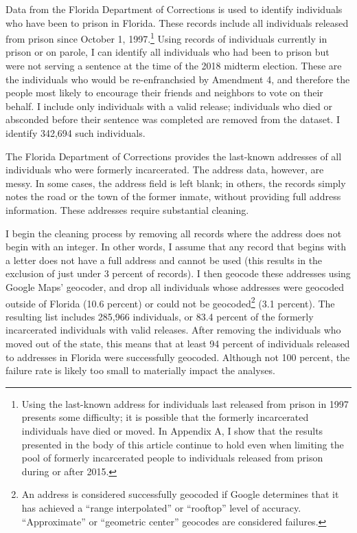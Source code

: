 \documentclass[
  12pt,
]{article}
\begin{document}
Data from the Florida Department of Corrections is used to identify individuals who have been to prison in Florida. These records include all individuals released from prison since October 1, 1997.\footnote{Using the last-known address for individuals last released from prison in 1997 presents some difficulty; it is possible that the formerly incarcerated individuals have died or moved. In Appendix A, I show that the results presented in the body of this article continue to hold even when limiting the pool of formerly incarcerated people to individuals released from prison during or after 2015.} Using records of individuals currently in prison or on parole, I can identify all individuals who had been to prison but were not serving a sentence at the time of the 2018 midterm election. These are the individuals who would be re-enfranchsied by Amendment 4, and therefore the people most likely to encourage their friends and neighbors to vote on their behalf. I include only individuals with a valid release; individuals who died or absconded before their sentence was completed are removed from the dataset. I identify 342,694 such individuals.

The Florida Department of Corrections provides the last-known addresses of all individuals who were formerly incarcerated. The address data, however, are messy. In some cases, the address field is left blank; in others, the records simply notes the road or the town of the former inmate, without providing full address information. These addresses require substantial cleaning.

I begin the cleaning process by removing all records where the address does not begin with an integer. In other words, I assume that any record that begins with a letter does not have a full address and cannot be used (this results in the exclusion of just under 3 percent of records). I then geocode these addresses using Google Maps' geocoder, and drop all individuals whose addresses were geocoded outside of Florida (10.6 percent) or could not be geocoded\footnote{An address is considered successfully geocoded if Google determines that it has achieved a ``range interpolated'' or ``rooftop'' level of accuracy. ``Approximate'' or ``geometric center'' geocodes are considered failures.} (3.1 percent). The resulting list includes 285,966 individuals, or 83.4 percent of the formerly incarcerated individuals with valid releases. After removing the individuals who moved out of the state, this means that at least 94 percent of individuals released to addresses in Florida were successfully geocoded. Although not 100 percent, the failure rate is likely too small to materially impact the analyses.
\end{document}
